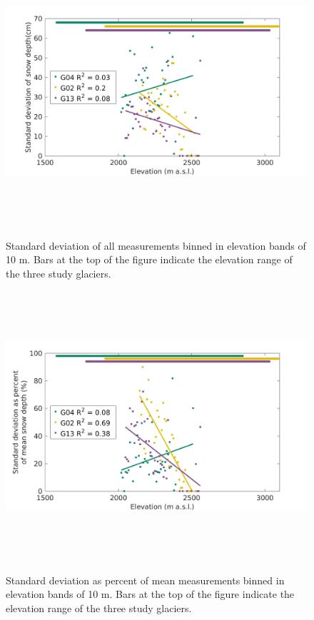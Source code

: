 \documentclass[12pt]{article}
\begin{document}
{
\begin{figure} 
\centering
	\includegraphics[height = 10cm]{binned_std.png}\\
	\caption{Standard deviation of all measurements binned in elevation bands of 10 m. Bars at the top of the figure indicate the elevation range of the three study glaciers.}
	\label{fig:std_binned}
\end{figure}
}

{
\begin{figure} 
\centering
	\includegraphics[height = 10cm]{binned_std_percent.png}\\
	\caption{Standard deviation as percent of mean measurements binned in elevation bands of 10 m. Bars at the top of the figure indicate the elevation range of the three study glaciers.}
	\label{fig:std_binned_percent}
\end{figure}
}
\end{document}
